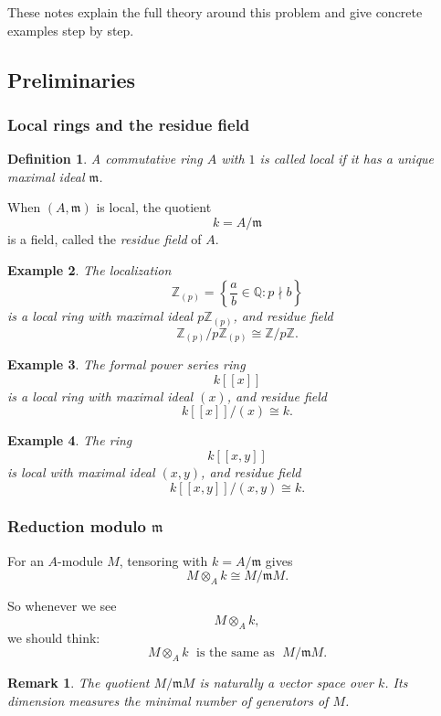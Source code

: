 \documentclass[12pt,a4paper]{article}
\theoremstyle{notespace}
\newtheorem{definition}{Definition}[section]
\newtheorem{remark}{Remark}[section]
\newtheorem{example}[definition]{Example}
\newcommand{\ZZ}{\mathbb{Z}}
\newcommand{\m}{\mathfrak m}
\begin{document}
These notes explain the full theory around this problem and give concrete examples step by step.

\subsection{Preliminaries}

\subsubsection{Local rings and the residue field}

\begin{definition}
	A commutative ring \(A\) with \(1\) is called \emph{local} if it has a unique maximal ideal \(\m\).
\end{definition}

When \((A,\m)\) is local, the quotient
\[
k=A/\m
\]
is a field, called the \emph{residue field} of \(A\).

\begin{example}
	The localization
	\[
	\ZZ_{(p)}=\left\{\frac{a}{b}\in \mathbb Q: p\nmid b\right\}
	\]
	is a local ring with maximal ideal \(p\ZZ_{(p)}\), and residue field
	\[
	\ZZ_{(p)}/p\ZZ_{(p)}\cong \ZZ/p\ZZ.
	\]
\end{example}

\begin{example}
	The formal power series ring
	\[
	k[[x]]
	\]
	is a local ring with maximal ideal \((x)\), and residue field
	\[
	k[[x]]/(x)\cong k.
	\]
\end{example}

\begin{example}
	The ring
	\[
	k[[x,y]]
	\]
	is local with maximal ideal \((x,y)\), and residue field
	\[
	k[[x,y]]/(x,y)\cong k.
	\]
\end{example}

\subsubsection{Reduction modulo \(\m\)}

For an \(A\)-module \(M\), tensoring with \(k=A/\m\) gives
\[
M\otimes_A k \cong M/\m M.
\]

So whenever we see
\[
M\otimes_A k,
\]
we should think:
\[
M\otimes_A k \;\text{ is the same as }\; M/\m M.
\]

\begin{remark}
	The quotient \(M/\m M\) is naturally a vector space over \(k\). Its dimension measures the minimal number of generators of \(M\).
\end{remark}
\end{document}
